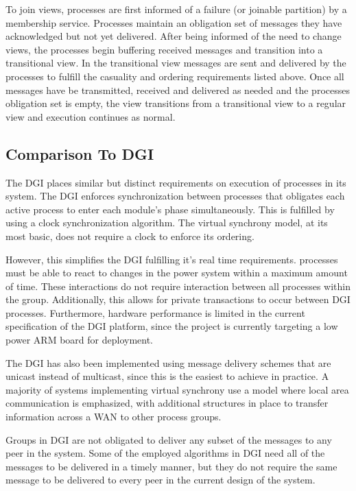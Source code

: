 To join views, processes are first informed of a failure (or joinable partition) 
by a membership service. Processes maintain an obligation set of messages they
have acknowledged but not yet delivered. After being informed of the need to
change views, the processes begin buffering received messages and transition
into a transitional view. In the transitional view messages are sent and
delivered by the processes to fulfill the casuality and ordering requirements
listed above. Once all messages have be transmitted, received and delivered as
needed and the processes obligation set is empty, the view transitions from a
transitional view to a regular view and execution continues as normal.

\subsection{Comparison To DGI}

The DGI places similar but distinct requirements on execution of processes in
its system. The DGI enforces synchronization between processes that obligates
each active process to enter each module's phase simultaneously. This is
fulfilled by using a clock synchronization algorithm. The virtual synchrony
model, at its most basic, does not require a clock to enforce its ordering.

However, this simplifies the DGI fulfilling it's real time requirements. 
processes must be able to react to changes in the power system within a
maximum amount of time. These interactions do not require interaction between
all processes within the group. Additionally, this allows for private
transactions to occur between DGI processes. Furthermore, hardware performance
is limited in the current specification of the DGI platform, since the
project is currently targeting a low power ARM board for deployment.

The DGI has also been implemented using message delivery schemes that are
unicast instead of multicast, since this is the easiest to achieve in
practice. A majority of systems implementing virtual synchrony use a model 
where local area communication is emphasized, with additional structures in
place to transfer information across a WAN to other process groups.

Groups in DGI are not obligated to deliver any subset of the messages to any
peer in the system. Some of the employed algorithms in DGI need all of the
messages to be delivered in a timely manner, but they do not require the same
message to be delivered to every peer in the current design of the system.

